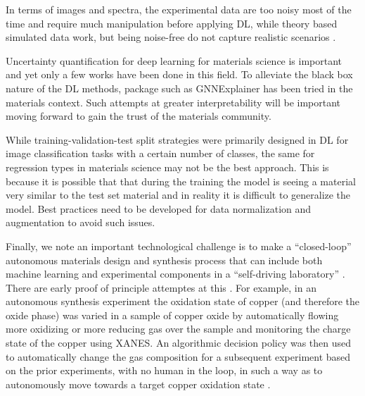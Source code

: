 \documentclass[pdflatex,sn-mathphys]{sn-jnl}%
\theoremstyle{thmstyleone}%
\theoremstyle{thmstyletwo}%
\theoremstyle{thmstylethree}%
\begin{document}
In terms of images and spectra, the experimental data are too noisy most of the time and require much manipulation before applying DL, while theory based simulated data work, but being noise-free do not capture realistic scenarios \cite{choudhary2021computational}. 

Uncertainty quantification for deep learning for materials science is important and yet only a few works have been done in this field. To alleviate the black box nature of the DL methods, package such as GNNExplainer \cite{ying2019gnnexplainer} has been tried in the materials context. Such attempts at greater interpretability will be important moving forward to gain the trust of the materials community. 

While training-validation-test split strategies were primarily designed in DL for image classification tasks with a certain number of classes, the same for regression types in materials science may not be the best approach. This is because it is possible that that during the training the model is seeing a material very similar to the test set material and in reality it is difficult to generalize the model. Best practices need to be developed for data normalization and augmentation to avoid such issues.

Finally, we note an important technological challenge is to make a ``closed-loop'' autonomous materials design and synthesis process \cite{roch2018chemos,szymanski2021toward} that can include both machine learning and experimental components in a ``self-driving laboratory'' \cite{macleod2020self}. There are early proof of principle attemptes at this \cite{stach;m21}. For example, in an autonomous synthesis experiment the oxidation state of copper  (and therefore the oxide phase) was varied in a sample of copper oxide by automatically flowing more oxidizing or more reducing gas over the sample and monitoring the charge state of the copper using XANES.  An algorithmic decision policy was then used to automatically change the gas composition for a subsequent experiment based on the prior experiments, with no human in the loop, in such a way as to autonomously move towards a target copper oxidation state \cite{rakit;jacs20}. 




\end{document}

